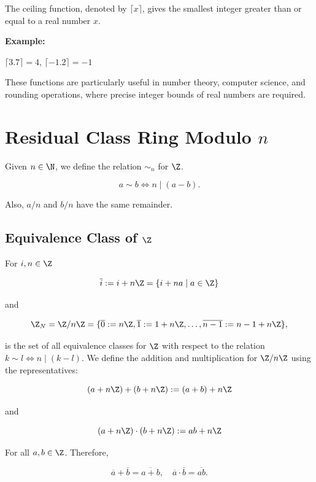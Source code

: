 The ceiling function, denoted by \(\lceil x \rceil\), gives the smallest integer greater than or 
equal to a real number \(x\).

\textbf{Example:}

\(\lceil 3.7 \rceil = 4\), \(\lceil -1.2 \rceil = -1\)

These functions are particularly useful in number theory, computer science, and rounding operations, where precise integer bounds of real numbers are required.

\section{Residual Class Ring Modulo \texorpdfstring{\(n\)}{}}

Given \(n \in \N\), we define the relation \(\sim_n\) for \(\Z\).

\[
    a \sim b \iff n \mid (a - b).
\]

Also, \(a / n\) and \(b / n\) have the same remainder.

\subsection{Equivalence Class of \texorpdfstring{\(\Z\)}{}} 

For \(i, n \in \Z\) 

\[
    \overline{i} := i + n \Z = \{ i + na \mid a \in \Z\}
\]

and 

\[
    \Z_N = \Z / n \Z = \{\overline{0}:= n \Z, \overline{1}:= 1 + n \Z, \dots, \overline{n - 1} := n - 1 + n \Z \},
\]

is the set of all equivalence classes for \(\Z\) with respect to the relation 
\(k \sim l \iff n \mid (k - l)\). We define the addition and multiplication for \(\Z / n \Z\) using the representatives:

\[
    (a  + n \Z) + (b + n \Z) := (a + b) + n\Z
\]

and 

\[
    (a  + n \Z) \cdot (b + n \Z) := ab + n\Z
\]

For all \(a, b \in \Z\). Therefore, 

\[
    \overline{a} + \overline{b} = \overline{a + b}, \quad \overline{a} \cdot \overline{b} = \overline{ab}.
\]

